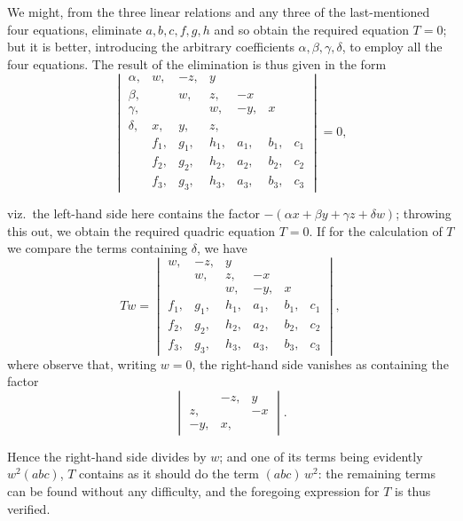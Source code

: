 \documentclass[11pt,a4paper]{article}
\begin{document}
\medskip

We might, from the three linear relations and any three of the last-mentioned four equations, eliminate $a, b, c, f, g, h$ and so obtain the required equation $T = 0$; but it is better, introducing the arbitrary coefficients $\alpha, \beta, \gamma, \delta$, to employ all the four equations. The result of the elimination is thus given in the form
\[
\begin{vmatrix}
\alpha, & w, & -z, & y &\\
\beta, & & w, & z, & -x\\
\gamma, & & & w, & -y, & x\\
\delta, & x, & y, & z, & & \\
& f_{1}, & g_{1}, & h_{1}, & a_{1}, & b_{1}, & c_{1}\\
& f_{2}, & g_{2}, & h_{2}, & a_{2}, & b_{2}, & c_{2}\\
& f_{3}, & g_{3}, & h_{3}, & a_{3}, & b_{3}, & c_{3}
\end{vmatrix} = 0,
\]

\newpage


\noindent viz.\ the left-hand side here contains the factor $-(\alpha x + \beta y + \gamma z + \delta w)$; throwing this out, we obtain the required quadric equation $T = 0$. If for the calculation of $T$ we compare the terms containing $\delta$, we have
\[
T w = \begin{vmatrix}
w, & -z, & y &\\
& w, & z, & -x\\
& & w, & -y, & x\\
f_{1}, & g_{1}, & h_{1}, & a_{1}, & b_{1}, & c_{1}\\
f_{2}, & g_{2}, & h_{2}, & a_{2}, & b_{2}, & c_{2}\\
f_{3}, & g_{3}, & h_{3}, & a_{3}, & b_{3}, & c_{3}
\end{vmatrix},
\]
where observe that, writing $w = 0$, the right-hand side vanishes as containing the factor
\[
\begin{vmatrix}
& -z, & y\\
z, & & -x\\
-y, & x, &
\end{vmatrix}.
\]

Hence the right-hand side divides by $w$; and one of its terms being evidently $w^{2}(abc)$, $T$ contains as it should do the term $(abc)\,w^{2}$: the remaining terms can be found without any difficulty, and the foregoing expression for $T$ is thus verified.
\end{document}
